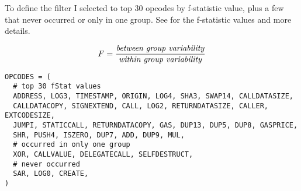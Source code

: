 \documentclass[../main.tex]{subfiles}
\begin{document}
To define the  filter I selected to top 30 opcodes by f-statistic value, plus a few that never occurred or only in one group. See  for the f-statistic values and more details.

\begin{equation}
  F = \dfrac{\mbox{\textit{between group variability}}}{\mbox{\textit{within group variability}}}
  \label{eq:ftest}
\end{equation}

\begin{lstlisting}[style=pymd]
OPCODES = (
  # top 30 fStat values
  ADDRESS, LOG3, TIMESTAMP, ORIGIN, LOG4, SHA3, SWAP14, CALLDATASIZE,
  CALLDATACOPY, SIGNEXTEND, CALL, LOG2, RETURNDATASIZE, CALLER, EXTCODESIZE,
  JUMPI, STATICCALL, RETURNDATACOPY, GAS, DUP13, DUP5, DUP8, GASPRICE,
  SHR, PUSH4, ISZERO, DUP7, ADD, DUP9, MUL,
  # occurred in only one group
  XOR, CALLVALUE, DELEGATECALL, SELFDESTRUCT,
  # never occurred
  SAR, LOG0, CREATE,
)
\end{lstlisting}
\end{document}

